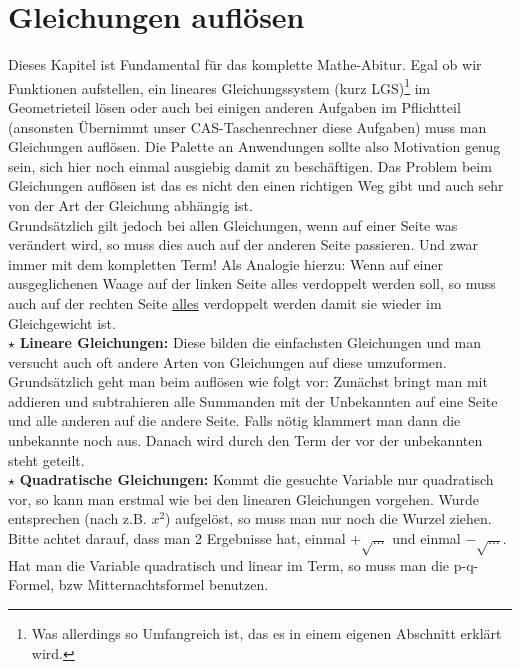\section{Gleichungen auflösen}
	Dieses Kapitel ist Fundamental für das komplette Mathe-Abitur. Egal ob wir
	Funktionen aufstellen, ein lineares Gleichungssystem (kurz LGS)\footnote{Was
	allerdings so Umfangreich ist, das es in einem eigenen Abschnitt erklärt wird.}
	im Geometrieteil lösen oder auch bei einigen anderen Aufgaben im Pflichtteil
	(ansonsten Übernimmt unser CAS-Taschenrechner diese Aufgaben) muss man
	Gleichungen auflösen. Die Palette an Anwendungen sollte also Motivation genug
	sein, sich hier noch einmal ausgiebig damit zu beschäftigen. Das Problem beim
	Gleichungen auflösen ist das es nicht den einen richtigen Weg gibt und auch
	sehr von der Art der Gleichung abhängig ist.\\
	Grundsätzlich gilt jedoch bei allen Gleichungen, wenn auf einer Seite was
	verändert wird, so muss dies auch auf der anderen Seite passieren. Und zwar
	immer mit dem kompletten Term! Als Analogie hierzu: Wenn auf einer
	ausgeglichenen Waage auf der linken Seite alles verdoppelt werden soll, so muss
	auch auf der rechten Seite \underline{alles} verdoppelt werden damit sie wieder
	im Gleichgewicht ist.\\
	
	\(\star\) \textbf{Lineare Gleichungen: } Diese bilden die einfachsten
	Gleichungen und man versucht auch oft andere Arten von Gleichungen auf diese
	umzuformen. Grundsätzlich geht man beim auflösen wie folgt vor: Zunächst bringt
	man mit addieren und subtrahieren alle Summanden mit der Unbekannten auf eine
	Seite und alle anderen auf die andere Seite. Falls nötig klammert man dann die
	unbekannte noch aus. Danach wird durch den Term der vor der unbekannten steht
	geteilt.\\
	
	\(\star\) \textbf{Quadratische Gleichungen: } Kommt die gesuchte Variable nur
	quadratisch vor, so kann man erstmal wie bei den linearen Gleichungen vorgehen.
	Wurde entsprechen (nach z.B. \(x^2\)) aufgelöst, so muss man nur noch die
	Wurzel ziehen. Bitte achtet darauf, dass man 2 Ergebnisse hat, einmal
	\(+\sqrt{\ldots}\) und einmal \(-\sqrt{\ldots}\).\\
	Hat man die Variable quadratisch und linear im Term, so muss man die
	p-q-Formel, bzw Mitternachtsformel benutzen.\\
	

